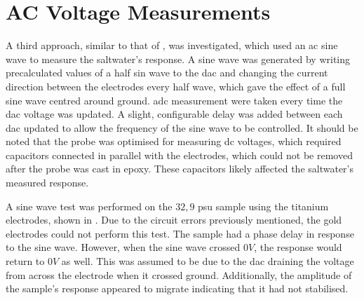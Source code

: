 \section{AC Voltage Measurements}\label{sec:ac-voltage-measurements}

A third approach, similar to that of , was investigated, which used an \gls{ac} sine wave to measure the saltwater's response.
A sine wave was generated by writing precalculated values of a half sin wave to the \gls{dac} and changing the current direction between the electrodes every half wave, which gave the effect of a full sine wave centred around ground.
\Gls{adc} measurement were taken every time the \gls{dac} voltage was updated.
A slight, configurable delay was added between each \gls{dac} updated to allow the frequency of the sine wave to be controlled.
It should be noted that the probe was optimised for measuring \gls{dc} voltages, which required capacitors connected in parallel with the electrodes, which could not be removed after the probe was cast in epoxy.
These capacitors likely affected the saltwater's measured response.

A sine wave test was performed on the $32,9$ \gls{psu} sample using the titanium electrodes, shown in .
Due to the circuit errors previously mentioned, the gold electrodes could not perform this test.
The sample had a phase delay in response to the sine wave.
However, when the sine wave crossed $0V$, the response would return to $0V$ as well. 
This was assumed to be due to the \gls{dac} draining the voltage from across the electrode when it crossed ground.
Additionally, the amplitude of the sample's response appeared to migrate indicating that it had not stabilised.

